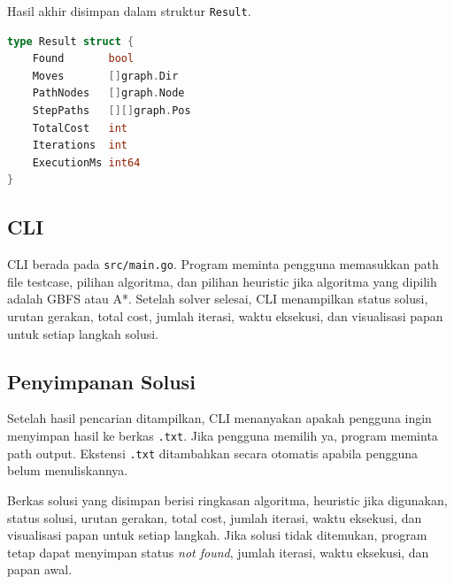 Hasil akhir disimpan dalam struktur \texttt{Result}.
\begin{lstlisting}[language=Go, basicstyle=\ttfamily\small, breaklines=true]
type Result struct {
    Found       bool
    Moves       []graph.Dir
    PathNodes   []graph.Node
    StepPaths   [][]graph.Pos
    TotalCost   int
    Iterations  int
    ExecutionMs int64
}
\end{lstlisting}

\subsection{CLI}\label{sub:CLI}

CLI berada pada \texttt{src/main.go}. Program meminta pengguna
memasukkan path file testcase, pilihan algoritma, dan pilihan
heuristic jika algoritma yang dipilih adalah GBFS atau A*. Setelah
solver selesai, CLI menampilkan status solusi, urutan gerakan, total
cost, jumlah iterasi, waktu eksekusi, dan visualisasi papan untuk
setiap langkah solusi.

\subsection{Penyimpanan Solusi}\label{sub:Penyimpanan Solusi}

Setelah hasil pencarian ditampilkan, CLI menanyakan apakah pengguna
ingin menyimpan hasil ke berkas \texttt{.txt}. Jika pengguna memilih
ya, program meminta path output. Ekstensi \texttt{.txt} ditambahkan
secara otomatis apabila pengguna belum menuliskannya.

Berkas solusi yang disimpan berisi ringkasan algoritma, heuristic
jika digunakan, status solusi, urutan gerakan, total cost, jumlah
iterasi, waktu eksekusi, dan visualisasi papan untuk setiap langkah.
Jika solusi tidak ditemukan, program tetap dapat menyimpan status
\textit{not found}, jumlah iterasi, waktu eksekusi, dan papan awal.
